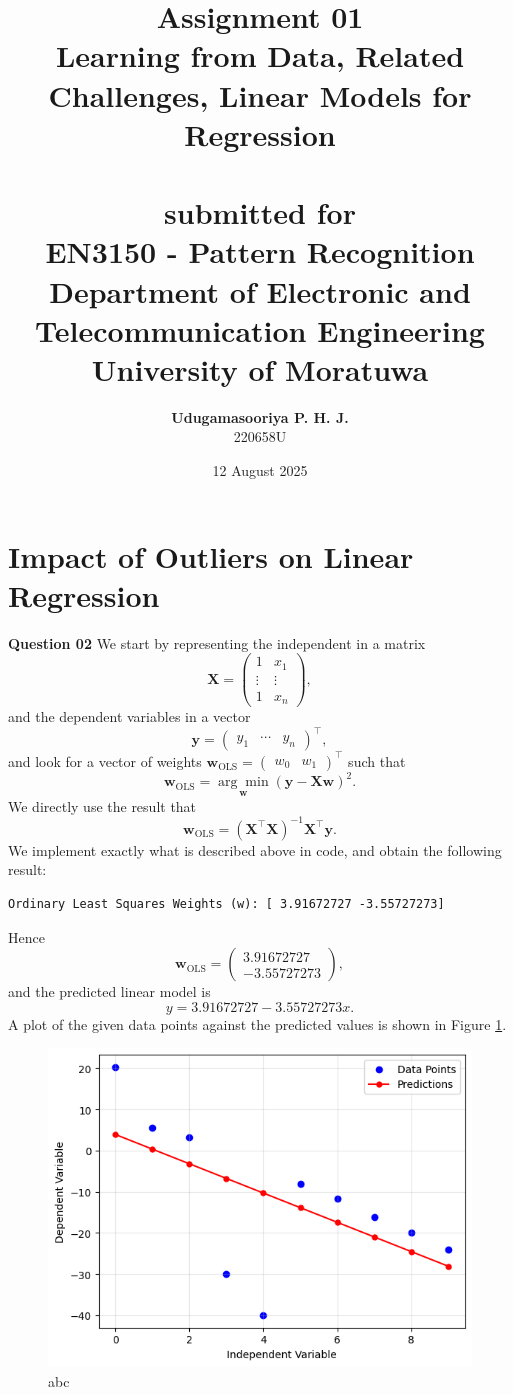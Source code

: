 \documentclass{article}[a4paper]
\title{
	\huge{\textbf{
		Assignment 01
	}}\\
	\Large{
		Learning from Data, Related Challenges, Linear Models for Regression
	}\\
	\large{\phantom{}}\\
	\large{
		submitted for
	}\\
	\LARGE{
		\textbf{EN3150 - Pattern Recognition}
	}\\
	\large{
		Department of Electronic and Telecommunication Engineering
	}
	\\
	\large{University of Moratuwa}
}
\author{
	\textbf{Udugamasooriya P. H. J.}\\
	220658U %
}
\date{12 August 2025}
\begin{document}
	\maketitle

	\section{Impact of Outliers on Linear Regression}

	\textbf{Question 02}
	We start by representing the independent in a matrix \[
		\mathbf{X} = \begin{pmatrix}
			1		& x_1		\\
			\vdots	& \vdots	\\
			1		& x_n
		\end{pmatrix},
	\] and the dependent variables in a vector \[
		\mathbf{y} = \begin{pmatrix}
			y_1 & \cdots & y_n
		\end{pmatrix} ^ \top,
	\] and look for a vector of weights $\mathbf{w}_\text{OLS} = \begin{pmatrix} w_0 & w_1 \end{pmatrix} ^ \top$ such that \[
		\mathbf{w}_\text{OLS}
		=
		\underset{\mathbf{w}}{\arg\min}
		\left( \mathbf{y} - \mathbf{X} \mathbf{w} \right)^2.
	\] We directly use the result that \[
		\mathbf{w}_\text{OLS}
		=
		\left( \mathbf{X}^\top \mathbf{X} \right)^{-1} \mathbf{X}^\top \mathbf{y}.
	\] We implement exactly what is described above in code, and obtain the following result:
	\begin{lstlisting}
Ordinary Least Squares Weights (w): [ 3.91672727 -3.55727273]
	\end{lstlisting}
	Hence \[
		\mathbf{w}_\text{OLS} = \begin{pmatrix} 3.91672727 \\ -3.55727273 \end{pmatrix},
	\] and the predicted linear model is \[
		y = 3.91672727 - 3.55727273 x.
	\]
	A plot of the given data points against the predicted values is shown in Figure \ref{q1}.

	\begin{figure}[H]
		\centering
		\includegraphics[width=0.7\linewidth]{images/q1.png}
		\caption{abc}
		\label{q1}
	\end{figure}
\end{document}

